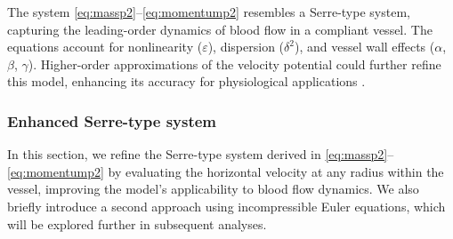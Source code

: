 \documentclass[alpha-refs, 12pt]{wiley-article}
\begin{document}
The system \eqref{eq:massp2}--\eqref{eq:momentump2} resembles a Serre-type system, capturing the leading-order dynamics of blood flow in a compliant vessel. The equations account for nonlinearity ($\varepsilon$), dispersion ($\delta^2$), and vessel wall effects ($\alpha$, $\beta$, $\gamma$). Higher-order approximations of the velocity potential could further refine this model, enhancing its accuracy for physiological applications \cite{Mitsotakis2019}.

\subsubsection{Enhanced Serre-type system}\label{sec:cbsys}

In this section, we refine the Serre-type system derived in \eqref{eq:massp2}--\eqref{eq:momentump2} by evaluating the horizontal velocity at any radius within the vessel, improving the model's applicability to blood flow dynamics. We also briefly introduce a second approach using incompressible Euler equations, which will be explored further in subsequent analyses.
\end{document}
